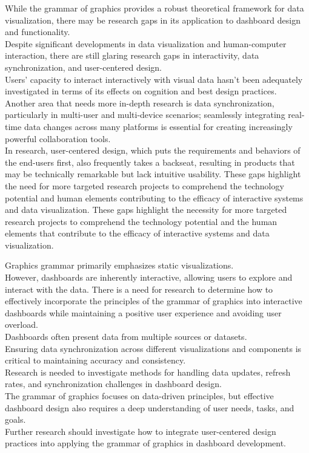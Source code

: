 \documentclass[print]{nuthesis}
\begin{document}
While the grammar of graphics provides a robust theoretical framework for data visualization, there may be research gaps in its application to dashboard design and functionality.\\
Despite significant developments in data visualization and human-computer interaction, there are still glaring research gaps in interactivity, data synchronization, and user-centered design.\\
Users' capacity to interact interactively with visual data hasn't been adequately investigated in terms of its effects on cognition and best design practices.\\
Another area that needs more in-depth research is data synchronization, particularly in multi-user and multi-device scenarios; seamlessly integrating real-time data changes across many platforms is essential for creating increasingly powerful collaboration tools.\\
In research, user-centered design, which puts the requirements and behaviors of the end-users first, also frequently takes a backseat, resulting in products that may be technically remarkable but lack intuitive usability.
These gaps highlight the need for more targeted research projects to comprehend the technology potential and human elements contributing to the efficacy of interactive systems and data visualization.
These gaps highlight the necessity for more targeted research projects to comprehend the technology potential and the human elements that contribute to the efficacy of interactive systems and data visualization.

Graphics grammar primarily emphasizes static visualizations.\\
However, dashboards are inherently interactive, allowing users to explore and interact with the data.
There is a need for research to determine how to effectively incorporate the principles of the grammar of graphics into interactive dashboards while maintaining a positive user experience and avoiding user overload.\\
Dashboards often present data from multiple sources or datasets.\\
Ensuring data synchronization across different visualizations and components is critical to maintaining accuracy and consistency.\\
Research is needed to investigate methods for handling data updates, refresh rates, and synchronization challenges in dashboard design.\\
The grammar of graphics focuses on data-driven principles, but effective dashboard design also requires a deep understanding of user needs, tasks, and goals.\\
Further research should investigate how to integrate user-centered design practices into applying the grammar of graphics in dashboard development.
\end{document}
